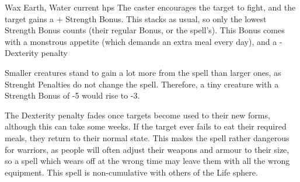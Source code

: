   {}%
  {Wax}%
  {Earth, Water}%
  {current \glspl{hp}}%
  {The caster encourages the target to fight, and the target gains a + Strength Bonus.
  This stacks as usual, so only the lowest Strength Bonus counts (their regular Bonus, or the spell's).
  This Bonus comes with a monstrous appetite (which demands an extra meal every day), and a - Dexterity penalty}%
  {
    Smaller creatures stand to gain a lot more from the spell than larger ones, as Strenght Penalties do not change the spell.
    Therefore, a tiny creature with a Strength Bonus of -5 would rise to -3.

    The Dexterity penalty fades once targets become used to their new forms, although this can take some weeks.
    If the target ever fails to eat their required meals, they return to their normal state.
    This makes the spell rather dangerous for warriors, as people will often adjust their weapons and armour to their size, so a spell which wears off at the wrong time may leave them with all the wrong equipment.
    This spell is non-cumulative with others of the Life sphere.}
